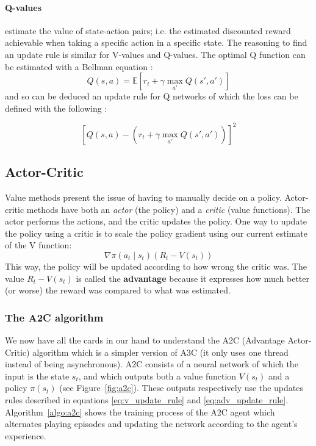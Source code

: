 \paragraph{Q-values} estimate the value of state-action pairs; i.e. the
estimated discounted reward achievable when taking a specific action in a 
specific state. The reasoning to find an update rule is similar for V-values
and Q-values. The optimal Q function can be estimated with a Bellman equation :
$$ Q(s, a) = \mathbb{E}\left[ r_t + \gamma \max\limits_{a'} Q(s', a') \right]$$
\noindent and so can be deduced an update rule for Q networks of which the loss
can be defined with the following :

\begin{equation}
	\label{eq:q_update_rule}
\left[Q(s, a) - \left( r_t + \gamma \max\limits_{a'} Q(s', a') \right) \right]^2
\end{equation}


\subsection{Actor-Critic}
Value methods present the issue of having to manually decide on a policy.
Actor-critic methods have both an \textit{actor} (the policy) and a
\textit{critic} (value functions). The actor performs the actions, and the 
critic updates the policy. One way to update the policy using a critic is to
scale the policy gradient using our current estimate of the V function:
\begin{equation}
	\label{eq:adv_update_rule}
\nabla \pi(a_t \mid s_t) (R_t - V(s_t))
\end{equation}
This way, the policy will be updated according to how wrong the critic was.
The value $R_t - V(s_t)$ is called the \textbf{advantage} 
because it expresses how much better (or worse) the reward was compared to 
what was estimated.


\subsubsection{The A2C algorithm}
We now have all the cards in our hand to understand the A2C
(Advantage Actor-Critic) algorithm which is a simpler version of A3C \cite{a3c}
(it only uses one thread instead of being asynchronous). 
A2C consists of a neural network
of which the input is the state $s_t$, and which outputs both a value function
$V(s_t)$ and a policy $\pi(s_t)$ (see Figure~\ref{fig:a2c}). These outputs
respectively use the updates rules described in equations \ref{eq:v_update_rule}
and \ref{eq:adv_update_rule}.  Algorithm~\ref{algo:a2c} shows the training
process of the A2C agent which alternates playing episodes and updating the
network according to the agent's experience.

